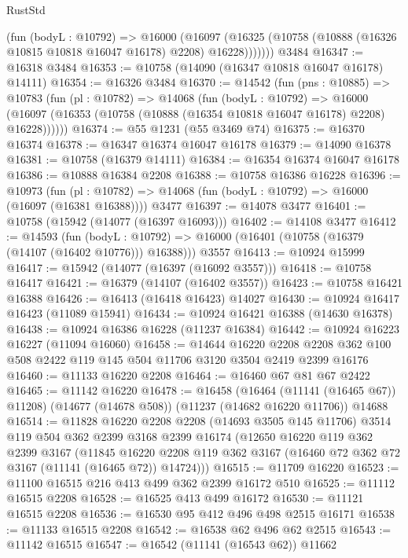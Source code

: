 \begin{lexlean}{RustStd}
\begin{coremodule}
          (fun (bodyL : @10792) =>
          @16000
            (@16097
              (@16325 (@10758 (@10888 (@16326 @10815 @10818 @16047 @16178) @2208) @16228)))))))
    @3484
@16347 := @16318 @3484
@16353 := @10758 (@14090 (@16347 @10818 @16047 @16178) @14111)
@16354 := @16326 @3484
@16370 := @14542
    (fun (pns : @10885) =>
    @10783
      (fun (pl : @10782) =>
      @14068
        (fun (bodyL : @10792) =>
        @16000 (@16097 (@16353 (@10758 (@10888 (@16354 @10818 @16047 @16178) @2208) @16228))))))
@16374 := @55 @1231 (@55 @3469 @74)
@16375 := @16370 @16374
@16378 := @16347 @16374 @16047 @16178
@16379 := @14090 @16378
@16381 := @10758 (@16379 @14111)
@16384 := @16354 @16374 @16047 @16178
@16386 := @10888 @16384 @2208
@16388 := @10758 @16386 @16228
@16396 := @10973
    (fun (pl : @10782) => @14068 (fun (bodyL : @10792) => @16000 (@16097 (@16381 @16388))))
    @3477
@16397 := @14078 @3477
@16401 := @10758 (@15942 (@14077 (@16397 @16093)))
@16402 := @14108 @3477
@16412 := @14593
    (fun (bodyL : @10792) => @16000 (@16401 (@10758 (@16379 (@14107 (@16402 @10776))) @16388)))
    @3557
@16413 := @10924 @15999
@16417 := @15942 (@14077 (@16397 (@16092 @3557)))
@16418 := @10758 @16417
@16421 := @16379 (@14107 (@16402 @3557))
@16423 := @10758 @16421 @16388
@16426 := @16413 (@16418 @16423) @14027
@16430 := @10924 @16417 @16423 (@11089 @15941)
@16434 := @10924 @16421 @16388 (@14630 @16378)
@16438 := @10924 @16386 @16228 (@11237 @16384)
@16442 := @10924 @16223 @16227 (@11094 @16060)
@16458 := @14644
    @16220
    @2208
    @2208
    @362
    @100
    @508
    @2422
    @119
    @145
    @504
    @11706
    @3120
    @3504
    @2419
    @2399
    @16176
@16460 := @11133 @16220 @2208
@16464 := @16460 @67 @81 @67 @2422
@16465 := @11142 @16220
@16478 := @16458
    (@16464 (@11141 (@16465 @67)) @11208)
    (@14677 (@14678 @508))
    (@11237 (@14682 @16220 @11706))
    @14688
@16514 := @11828
    @16220
    @2208
    @2208
    (@14693 @3505 @145 @11706)
    @3514
    @119
    @504
    @362
    @2399
    @3168
    @2399
    @16174
    (@12650
      @16220
      @119
      @362
      @2399
      @3167
      (@11845
        @16220
        @2208
        @119
        @362
        @3167
        (@16460 @72 @362 @72 @3167 (@11141 (@16465 @72)) @14724)))
@16515 := @11709 @16220
@16523 := @11100 @16515 @216 @413 @499 @362 @2399 @16172 @510
@16525 := @11112 @16515 @2208
@16528 := @16525 @413 @499 @16172
@16530 := @11121 @16515 @2208
@16536 := @16530 @95 @412 @496 @498 @2515 @16171
@16538 := @11133 @16515 @2208
@16542 := @16538 @62 @496 @62 @2515
@16543 := @11142 @16515
@16547 := @16542 (@11141 (@16543 @62)) @11662

\end{coremodule}
\end{lexlean}
